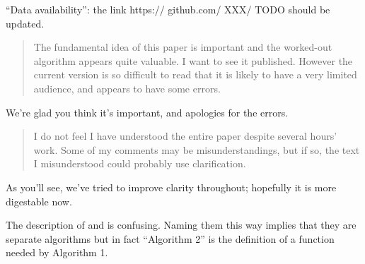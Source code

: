 \begin{point}{\revref} %
 ``Data availability'': the link https:// github.com/ XXX/ TODO should be updated.
\end{point}





\begin{quote}
The fundamental idea of this paper is important and the worked-out
algorithm appears quite valuable. I want to see it published. However
the current version is so difficult to read that it is likely to
have a very limited audience, and appears to have some errors.
\end{quote}

We're glad you think it's important, and apologies for the errors.

\begin{quote}
I do not feel I have understood the entire paper despite several
hours' work. Some of my comments may be misunderstandings, but if
so, the text I misunderstood could probably use clarification.
\end{quote}

As you'll see, we've tried to improve clarity throughout;
hopefully it is more digestable now.

\begin{point}{} %
The description of  and  is confusing.
Naming them this way implies that they are separate algorithms but
in fact ``Algorithm 2'' is the definition of a function needed by
Algorithm 1.
\end{point}


